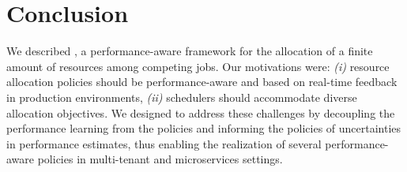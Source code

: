 

\section{Conclusion}
\label{sec:cilantro_conclusion}

We described \cilantro{}, a performance-aware framework for the allocation of a finite amount of resources among competing jobs.
Our motivations were:
\emph{(i)} resource allocation policies should be performance-aware and based on
real-time feedback in production environments,
\emph{(ii)} schedulers should accommodate diverse allocation objectives.
We designed \cilantros to address these challenges by decoupling the performance learning from the policies and informing the policies of uncertainties in performance estimates, thus
enabling the realization of several performance-aware
policies in multi-tenant and microservices settings.

